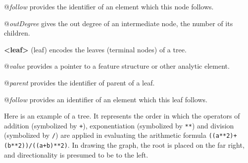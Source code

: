 \begin{sansreflist}
\begin{sansreflist}
    \item[@{\itshape follow}]
  provides the identifier of an element which this node follows.
    \item[@{\itshape outDegree}]
  gives the out degree of an intermediate node, the number of its children.
\end{sansreflist}  
\item [\textbf{<leaf>}] (leaf) encodes the leaves (terminal nodes) of a tree.\hfil\\[-10pt]\begin{sansreflist}
    \item[@{\itshape value}]
  provides a pointer to a feature structure or other analytic element.
    \item[@{\itshape parent}]
  provides the identifier of parent of a leaf.
    \item[@{\itshape follow}]
  provides an identifier of an element which this leaf follows.
\end{sansreflist}  
\end{sansreflist}
\par
Here is an example of a tree. It represents the order in which the operators of addition (symbolized by \texttt{+}), exponentiation (symbolized by \texttt{**}) and division (symbolized by \texttt{/}) are applied in evaluating the arithmetic formula \texttt{((a**2)+(b**2))/((a+b)**2)}. In drawing the graph, the root is placed on the far right, and directionality is presumed to be to the left.\par
